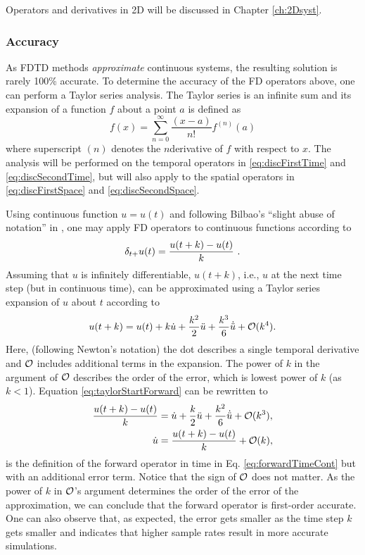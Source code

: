 Operators and derivatives in 2D will be discussed in Chapter \ref{ch:2Dsyst}.


\subsubsection{Accuracy}
As FDTD methods \textit{approximate} continuous systems, the resulting solution is rarely 100\% accurate. To determine the accuracy of the FD operators above, one can perform a Taylor series analysis. The Taylor series is an infinite sum and its expansion of a function $f$ about a point $a$ is defined as
\begin{equation}
    f(x) = \sum_{n=0}^{\infty} \frac{(x-a)}{n!}f^{(n)}(a)
\end{equation}
where superscript $(n)$ denotes the $n$\th derivative of $f$ with respect to $x$. The analysis will be performed on the temporal operators in \eqref{eq:discFirstTime} and \eqref{eq:discSecondTime},  but will also apply to the spatial operators in \eqref{eq:discFirstSpace} and \eqref{eq:discSecondSpace}.

Using continuous function $u=u(t)$ and following Bilbao's ``slight abuse of notation'' in \cite{theBible}, one may apply FD operators to continuous functions according to 
\begin{equation}\label{eq:forwardTimeCont}
    \delta_{t+} u(t) = \frac{u(t+k) - u(t)}{k}\ .
\end{equation}
%
Assuming that $u$ is infinitely differentiable, $u(t+k)$, i.e., $u$ at the next time step (but in continuous time), can be approximated using a Taylor series expansion of $u$ about $t$ according to
\begin{equation}\label{eq:taylorStartForward}
    u(t+k) = u(t) + k \dot u + \frac{k^2}{2} \ddot u + \frac{k^3}{6} \dot{\ddot{u}} + \mathcal{O}(k^4).
\end{equation}
Here, (following Newton's notation) the dot describes a single temporal derivative and $\mathcal{O}$ includes additional terms in the expansion. The power of $k$ in the argument of $\mathcal{O}$ describes the order of the error, which is lowest power of $k$ (as $k < 1$). Equation \eqref{eq:taylorStartForward} can be rewritten to 
\begin{align}
    \frac{u(t+k) - u(t)}{k} &= \dot u + \frac{k}{2} \ddot u +\frac{k^2}{6} \dot{\ddot{u}} + \mathcal{O}(k^3),\nonumber\\
    \dot u &= \frac{u(t+k) - u(t)}{k} + \mathcal{O}(k),
\end{align}
is the definition of the forward operator in time in Eq. \eqref{eq:forwardTimeCont} but with an additional error term. Notice that the sign of $\mathcal{O}$ does not matter.
As the power of $k$ in $\mathcal{O}$'s argument determines the order of the error of the approximation, we can conclude that the forward operator is first-order accurate. One can also observe that, as expected, the error gets smaller as the time step $k$ gets smaller and indicates that higher sample rates result in more accurate simulations.

